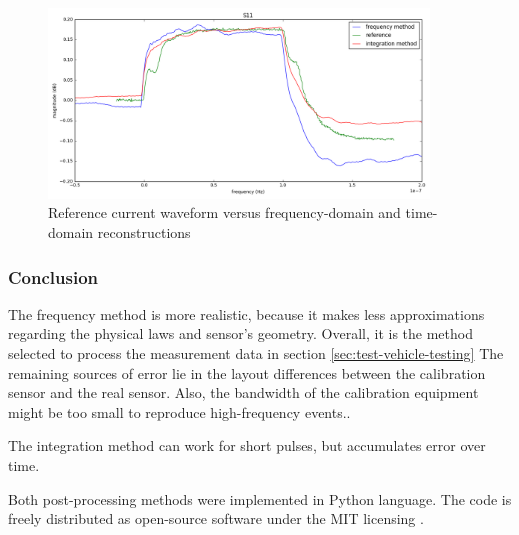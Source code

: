 \begin{figure}[!h]
  \centering
  \includegraphics[width=0.9\textwidth]{src/3/figures/final_comparison_reconstructions.png}
  \caption{Reference current waveform versus frequency-domain and time-domain reconstructions}
  \label{fig:freq-domain-reconstructed}
\end{figure}

\subsubsection{Conclusion}

The frequency method is more realistic, because it makes less approximations regarding the physical laws and sensor's geometry.
Overall, it is the method selected to process the measurement data in section \ref{sec:test-vehicle-testing}
The remaining sources of error lie in the layout differences between the calibration sensor and the real sensor.
Also, the bandwidth of the calibration equipment might be too small to reproduce high-frequency events..

The integration method can work for short pulses, but accumulates error over time.

Both post-processing methods were implemented in Python language.
The code is freely distributed \cite{nfs-repository} as open-source software under the MIT licensing \cite{mit-licensing}.
